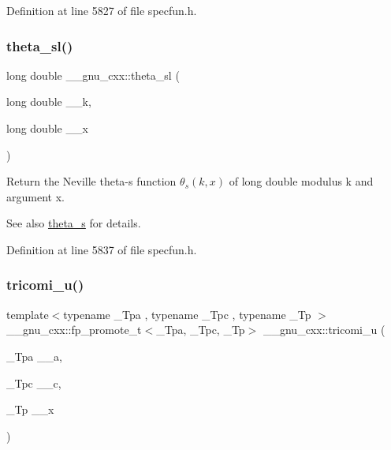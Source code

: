 Definition at line 5827 of file specfun.\+h.

\mbox{\label{group__mathsf__gnu_gac574077067a4e7b24a0a9ff2d537d885}} 
\subsubsection{\texorpdfstring{theta\+\_\+sl()}{theta\_sl()}}
{\footnotesize\ttfamily long double \+\_\+\+\_\+gnu\+\_\+cxx\+::theta\+\_\+sl (\begin{DoxyParamCaption}\item[{long double}]{\+\_\+\+\_\+k,  }\item[{long double}]{\+\_\+\+\_\+x }\end{DoxyParamCaption})\hspace{0.3cm}{\ttfamily [inline]}}

Return the Neville theta-\/s function $ \theta_s(k,x) $ of {\ttfamily long double} modulus {\ttfamily k} and argument {\ttfamily x}.

\begin{DoxySeeAlso}{See also}
\hyperlink{group__mathsf__gnu_gaf28f2dca107531890b49cccf2bdd67be}{theta\+\_\+s} for details. 
\end{DoxySeeAlso}


Definition at line 5837 of file specfun.\+h.

\mbox{\label{group__mathsf__gnu_gaf51a13fad85006e4d65c5b117e49f7d8}} 
\subsubsection{\texorpdfstring{tricomi\+\_\+u()}{tricomi\_u()}}
{\footnotesize\ttfamily template$<$typename \+\_\+\+Tpa , typename \+\_\+\+Tpc , typename \+\_\+\+Tp $>$ \\
\+\_\+\+\_\+gnu\+\_\+cxx\+::fp\+\_\+promote\+\_\+t$<$\+\_\+\+Tpa, \+\_\+\+Tpc, \+\_\+\+Tp$>$ \+\_\+\+\_\+gnu\+\_\+cxx\+::tricomi\+\_\+u (\begin{DoxyParamCaption}\item[{\+\_\+\+Tpa}]{\+\_\+\+\_\+a,  }\item[{\+\_\+\+Tpc}]{\+\_\+\+\_\+c,  }\item[{\+\_\+\+Tp}]{\+\_\+\+\_\+x }\end{DoxyParamCaption})\hspace{0.3cm}{\ttfamily [inline]}}

